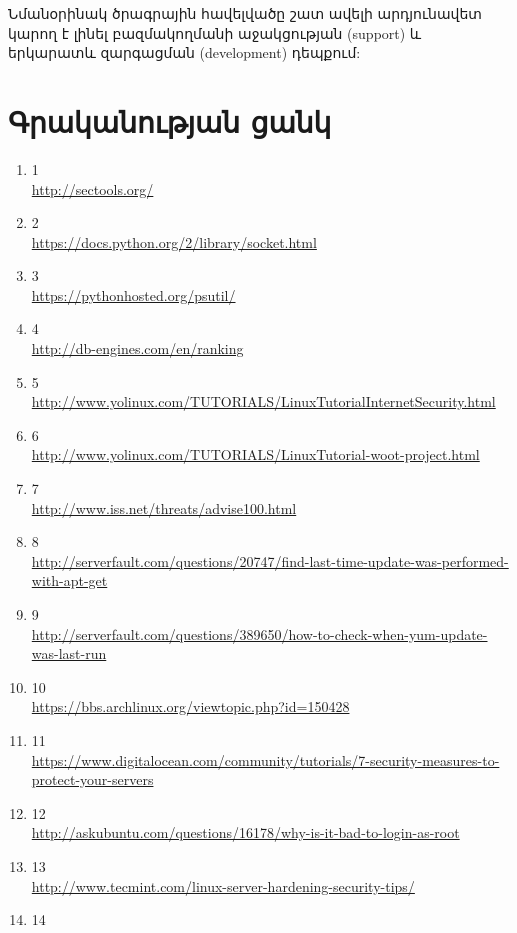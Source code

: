 \documentclass[a4paper,12pt]{article}
\begin{document}
\begin{sloppypar}
Նմանօրինակ ծրագրային հավելվածը շատ ավելի արդյունավետ կարող է
լինել բազմակողմանի աջակցության (support) և երկարատև զարգացման
(development) դեպքում:


\newpage
\section*{Գրականության ցանկ}
\begin{enumerate}
\item 1 \\
	\url{http://sectools.org/}
\item 2 \\
	\url{https://docs.python.org/2/library/socket.html}
\item 3 \\
	\url{https://pythonhosted.org/psutil/}
\item 4 \\
	\url{http://db-engines.com/en/ranking}
\item 5 \\
	\url{http://www.yolinux.com/TUTORIALS/LinuxTutorialInternetSecurity.html}
\item 6 \\
	\url{http://www.yolinux.com/TUTORIALS/LinuxTutorial-woot-project.html}
\item 7 \\
	\url{http://www.iss.net/threats/advise100.html}
\item 8 \\
	\url{http://serverfault.com/questions/20747/find-last-time-update-was-performed-with-apt-get}
\item 9 \\
	\url{http://serverfault.com/questions/389650/how-to-check-when-yum-update-was-last-run}
\item 10 \\
	\url{https://bbs.archlinux.org/viewtopic.php?id=150428}
\item 11 \\
	\url{https://www.digitalocean.com/community/tutorials/7-security-measures-to-protect-your-servers}
\item 12 \\
	\url{http://askubuntu.com/questions/16178/why-is-it-bad-to-login-as-root}
\item 13 \\
	\url{http://www.tecmint.com/linux-server-hardening-security-tips/}
\item 14 \\

\end{enumerate}
\end{sloppypar}
\end{document}
